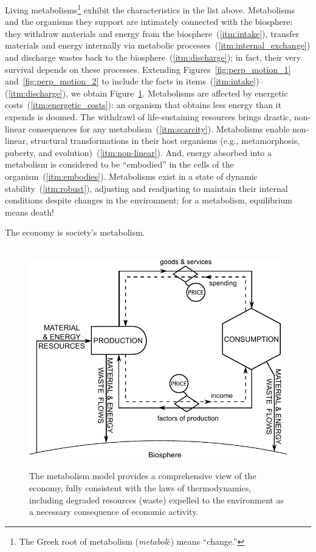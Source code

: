 Living metabolisms\footnote{The 
	Greek root of metabolism 
	(\emph{metabol$\bar{e}$}) means ``change.''}
exhibit the characteristics in the list above.
Metabolisms and the organisms they support
are intimately connected with the biosphere:
they withdraw materials and energy from the biosphere~(\ref{itm:intake}), 
transfer materials and energy internally via metabolic processes~(\ref{itm:internal_exchange})
and discharge wastes back to the biosphere~(\ref{itm:discharge});
in fact, their very survival depends on these processes.
Extending Figures~\ref{fig:perp_motion_1} and~\ref{fig:perp_motion_2}
to include the facts in items~(\ref{itm:intake})--(\ref{itm:discharge}), %
we obtain Figure~\ref{fig:metabolic_economy}.
Metabolisms are affected by energetic costs~(\ref{itm:energetic_costs}): 
an organism that obtains less energy than it expends is doomed.
The withdrawl of life-sustaining resources brings drastic, non-linear
consequences for any metabolism~(\ref{itm:scarcity}).
Metabolisms enable non-linear, structural transformations
in their host organisms (e.g., metamorphosis, puberty, and evolution)~(\ref{itm:non-linear}).
And, energy absorbed into a metabolism is considered to be ``embodied''
in the cells of the organism~(\ref{itm:embodies}).
Metabolisms exist in a state of dynamic stability~(\ref{itm:robust}),
adjusting and readjusting to maintain their internal conditions
despite changes in the environment;
for a metabolism, equilibrium means death!

The economy is society's metabolism.\cite{F-K1998, Giampietro2000, Giampietro2013}

\begin{figure}[!ht]
\centering\
\includegraphics[width=\linewidth]{Part_0/Chapter_Introduction/images/PERKS.pdf}
\caption[The metabolism model]{The metabolism model provides a comprehensive view 
of the economy, fully consistent with the laws of thermodynamics, 
including degraded resources (waste) expelled 
to the environment as a necessary consequence of economic activity.}
\label{fig:metabolic_economy}
\end{figure}


